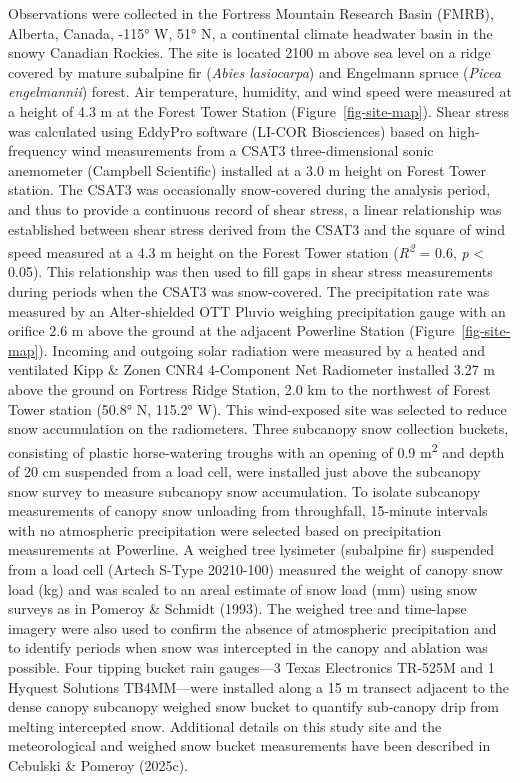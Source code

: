 \documentclass[
]{agujournal2019}
\begin{document}
Observations were collected in the Fortress Mountain Research Basin
(FMRB), Alberta, Canada, -115° W, 51° N, a continental climate headwater
basin in the snowy Canadian Rockies. The site is located 2100 m above
sea level on a ridge covered by mature subalpine fir (\emph{Abies
lasiocarpa}) and Engelmann spruce (\emph{Picea engelmannii}) forest. Air
temperature, humidity, and wind speed were measured at a height of 4.3 m
at the Forest Tower Station (Figure~\ref{fig-site-map}). Shear stress
was calculated using EddyPro software (LI-COR Biosciences) based on
high-frequency wind measurements from a CSAT3 three-dimensional sonic
anemometer (Campbell Scientific) installed at a 3.0 m height on Forest
Tower station. The CSAT3 was occasionally snow-covered during the
analysis period, and thus to provide a continuous record of shear
stress, a linear relationship was established between shear stress
derived from the CSAT3 and the square of wind speed measured at a 4.3 m
height on the Forest Tower station (\emph{R\textsuperscript{2}} = 0.6,
\emph{p} \textless{} 0.05). This relationship was then used to fill gaps
in shear stress measurements during periods when the CSAT3 was
snow-covered. The precipitation rate was measured by an Alter-shielded
OTT Pluvio weighing precipitation gauge with an orifice 2.6 m above the
ground at the adjacent Powerline Station (Figure~\ref{fig-site-map}).
Incoming and outgoing solar radiation were measured by a heated and
ventilated Kipp \& Zonen CNR4 4-Component Net Radiometer installed 3.27
m above the ground on Fortress Ridge Station, 2.0 km to the northwest of
Forest Tower station (50.8° N, 115.2° W). This wind-exposed site was
selected to reduce snow accumulation on the radiometers. Three subcanopy
snow collection buckets, consisting of plastic horse-watering troughs
with an opening of 0.9 m\textsuperscript{2} and depth of 20 cm suspended
from a load cell, were installed just above the subcanopy snow survey to
measure subcanopy snow accumulation. To isolate subcanopy measurements
of canopy snow unloading from throughfall, 15-minute intervals with no
atmospheric precipitation were selected based on precipitation
measurements at Powerline. A weighed tree lysimeter (subalpine fir)
suspended from a load cell (Artech S-Type 20210-100) measured the weight
of canopy snow load (kg) and was scaled to an areal estimate of snow
load (mm) using snow surveys as in Pomeroy \& Schmidt (1993). The
weighed tree and time-lapse imagery were also used to confirm the
absence of atmospheric precipitation and to identify periods when snow
was intercepted in the canopy and ablation was possible. Four tipping
bucket rain gauges---3 Texas Electronics TR-525M and 1 Hyquest Solutions
TB4MM---were installed along a 15 m transect adjacent to the dense
canopy subcanopy weighed snow bucket to quantify sub-canopy drip from
melting intercepted snow. Additional details on this study site and the
meteorological and weighed snow bucket measurements have been described
in Cebulski \& Pomeroy (2025c).
\end{document}
